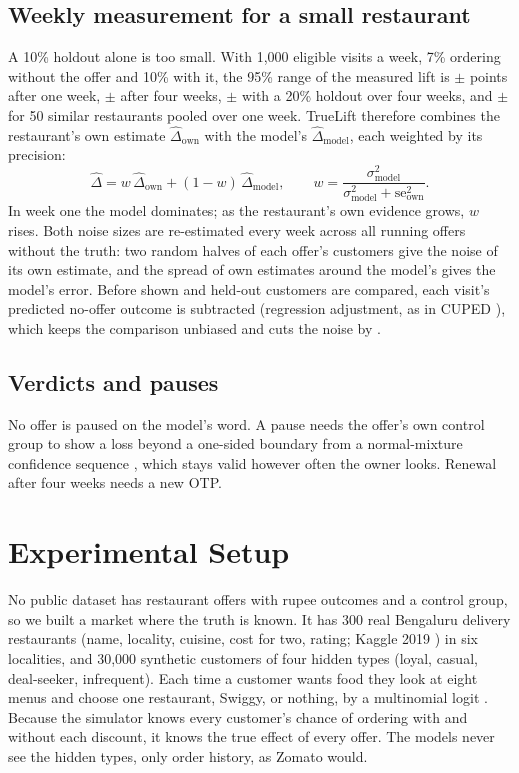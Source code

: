 \documentclass[conference]{IEEEtran}
\begin{document}
\subsection{Weekly measurement for a small restaurant}
A 10\% holdout alone is too small. With 1,000 eligible visits a week, 7\% ordering without the offer
and 10\% with it, the 95\% range of the measured lift is $\pm$ points after one week,
$\pm$ after four weeks, $\pm$ with a 20\% holdout over four weeks,
and $\pm$ for 50 similar restaurants pooled over one week. TrueLift therefore
combines the restaurant's own estimate $\hat\Delta_{\text{own}}$ with the model's $\hat\Delta_{\text{model}}$,
each weighted by its precision:
\begin{equation}
\hat\Delta = w\,\hat\Delta_{\text{own}}+(1-w)\,\hat\Delta_{\text{model}},\qquad
w=\frac{\sigma^2_{\text{model}}}{\sigma^2_{\text{model}}+\mathrm{se}^2_{\text{own}}}.
\end{equation}
In week one the model dominates; as the restaurant's own evidence grows, $w$ rises. Both noise sizes are
re-estimated every week across all running offers without the truth: two random halves of each offer's
customers give the noise of its own estimate, and the spread of own estimates around the model's gives
the model's error. Before shown and held-out customers are compared, each visit's predicted no-offer
outcome is subtracted (regression adjustment, as in CUPED \cite{cuped}), which keeps the comparison
unbiased and cuts the noise by .

\subsection{Verdicts and pauses}
No offer is paused on the model's word. A pause needs the offer's own control group to show a loss
beyond a one-sided boundary from a normal-mixture confidence sequence \cite{howard}, which stays valid
however often the owner looks. Renewal after four weeks needs a new OTP.

\section{Experimental Setup}
\label{sec:setup}

No public dataset has restaurant offers with rupee outcomes and a control group, so we built a market
where the truth is known. It has 300 real Bengaluru delivery restaurants (name, locality, cuisine, cost
for two, rating; Kaggle 2019 \cite{kaggle}) in six localities, and 30,000 synthetic customers of four
hidden types (loyal, casual, deal-seeker, infrequent). Each time a customer wants food they look at
eight menus and choose one restaurant, Swiggy, or nothing, by a multinomial logit \cite{mcfadden}.
Because the simulator knows every customer's chance of ordering with and without each discount, it
knows the true effect of every offer. The models never see the hidden types, only order history, as
Zomato would.
\end{document}
